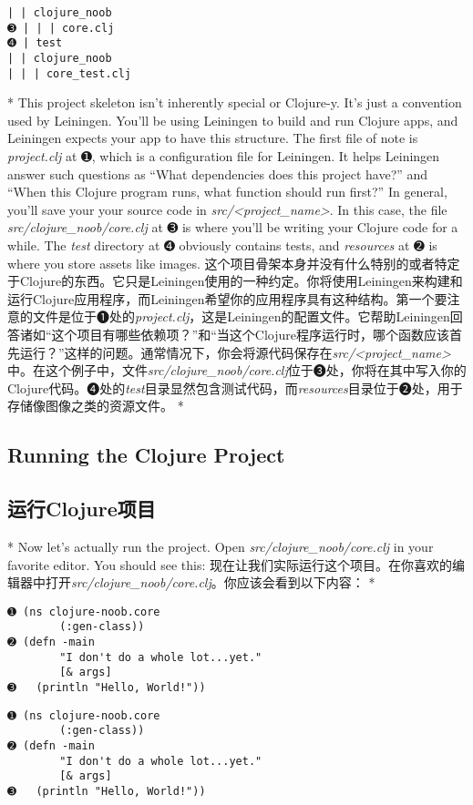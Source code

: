 \begin{paracol}{2}
\begin{verbatim}
| | clojure_noob
➌ | | | core.clj
➍ | test
| | clojure_noob
| | | core_test.clj
\end{verbatim}
\switchcolumn[0]*
This project skeleton isn't inherently special or Clojure-y. It's just a
convention used by Leiningen. You'll be using Leiningen to build and run
Clojure apps, and Leiningen expects your app to have this structure. The
first file of note is \emph{project.clj} at ➊, which is a configuration
file for Leiningen. It helps Leiningen answer such questions as ``What
dependencies does this project have?'' and ``When this Clojure program
runs, what function should run first?'' In general, you'll save your
your source code in \emph{src/\textless project\_name\textgreater{}}. In
this case, the file \emph{src/clojure\_noob/core.clj} at ➌ is where
you'll be writing your Clojure code for a while. The \emph{test}
directory at ➍ obviously contains tests, and \emph{resources} at ➋ is
where you store assets like images.
\switchcolumn
这个项目骨架本身并没有什么特别的或者特定于Clojure的东西。它只是Leiningen使用的一种约定。你将使用Leiningen来构建和运行Clojure应用程序，而Leiningen希望你的应用程序具有这种结构。第一个要注意的文件是位于➊处的\emph{project.clj}，这是Leiningen的配置文件。它帮助Leiningen回答诸如“这个项目有哪些依赖项？”和“当这个Clojure程序运行时，哪个函数应该首先运行？”这样的问题。通常情况下，你会将源代码保存在\emph{src/\textless project\_name\textgreater{}}中。在这个例子中，文件\emph{src/clojure\_noob/core.clj}位于➌处，你将在其中写入你的Clojure代码。➍处的\emph{test}目录显然包含测试代码，而\emph{resources}目录位于➋处，用于存储像图像之类的资源文件。
\switchcolumn[0]*
\subsection{Running the Clojure Project}
\switchcolumn
\subsection{运行Clojure项目}
\switchcolumn[0]*
Now let's actually run the project. Open
\emph{src/clojure\_noob/core.clj} in your favorite editor. You should
see this:
\switchcolumn
现在让我们实际运行这个项目。在你喜欢的编辑器中打开\emph{src/clojure\_noob/core.clj}。你应该会看到以下内容：
\switchcolumn[0]*
\begin{verbatim}
➊ (ns clojure-noob.core
        (:gen-class))
➋ (defn -main
        "I don't do a whole lot...yet."
        [& args]
➌   (println "Hello, World!"))
\end{verbatim}
\switchcolumn
\begin{verbatim}
➊ (ns clojure-noob.core
        (:gen-class))
➋ (defn -main
        "I don't do a whole lot...yet."
        [& args]
➌   (println "Hello, World!"))
\end{verbatim}


\end{paracol}
